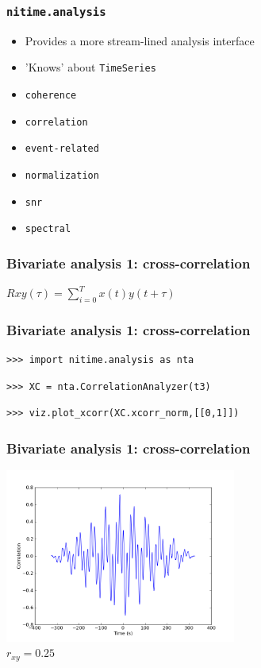 \documentclass{beamer}
\begin{document}
\begin{frame}
\frametitle{\tt{nitime.analysis}}
\begin{itemize}
\pause
\item 
Provides a more stream-lined analysis interface
\pause
\item 
'Knows' about \tt{TimeSeries} 
\pause
\item
\tt{coherence}
\pause
\item
\tt{correlation}
\pause
\item
\tt{event-related}
\pause
\item
\tt{normalization}
\pause
\item
\tt{snr}
\item
\pause
\tt{spectral}
\end{itemize}
\end{frame}

\begin{frame}
\frametitle{Bivariate analysis 1: cross-correlation}
$Rxy(\tau) = \sum_{i=0}^{T}{x(t)y(t+\tau)}$
\end{frame}

\begin{frame}[fragile]
\frametitle{Bivariate analysis 1: cross-correlation}
\pause
\begin{lstlisting}
>>> import nitime.analysis as nta
\end{lstlisting}

\pause
\begin{lstlisting}
>>> XC = nta.CorrelationAnalyzer(t3) 
\end{lstlisting}

\pause
\begin{lstlisting}
>>> viz.plot_xcorr(XC.xcorr_norm,[[0,1]])
\end{lstlisting}
\end{frame}

\begin{frame}
\frametitle{Bivariate analysis 1: cross-correlation}
\includegraphics[height=5.7cm]{figures/outa_phase_xcorr}
\pause 
\\
$r_{xy}=0.25$
\end{frame}
\end{document}
